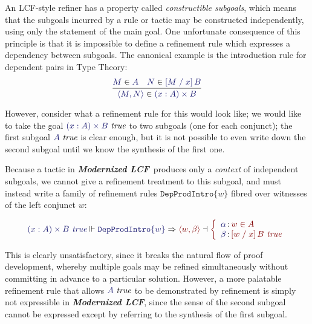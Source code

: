 \documentclass[11pt]{article}
\theoremstyle{definition}
\theoremstyle{remark}
\numberwithin{equation}{section}
\def\InputModeColorName{MidnightBlue}
\def\OutputModeColorName{Maroon}
\newcommand\InputMode[1]{{\color{\InputModeColorName}{#1}}}
\newcommand\OutputMode[1]{{\color{\OutputModeColorName}{#1}}}
\newcommand\Tuple[1]{\left\langle#1\right\rangle}
\newcommand\SG[2]{\InputMode{#1}\,{\color{Black}:}\,\OutputMode{#2}}
\newcommand\Refine[4]{\InputMode{#1}\Vdash\InputMode{#2}\Rightarrow\OutputMode{#4}\dashv\OutputMode{#3}}
\newcommand\Member[2]{\InputMode{#1}\in\InputMode{#2}}
\newcommand\MemberUnmoded[2]{#1\in #2}
\newcommand\IsTrue[1]{\InputMode{#1}\ \textit{true}}
\newcommand\IsTrueUnmoded[1]{#1\ \textit{true}}
\newcommand\DProdIntroRule[1]{\mathtt{DepProdIntro}\{#1\}}
\newcommand\TyDProd[3]{(#2:#1) \times #3}
\newcommand\Subst[3]{\left[#1\;/\;#2\right]#3}
\newcommand\ModLCF{\textbf{\emph{Modernized LCF}}}
\begin{document}
An LCF-style refiner has a property called \emph{constructible subgoals}, which
means that the subgoals incurred by a rule or tactic may be constructed
independently, using only the statement of the main goal. One unfortunate
consequence of this principle is that it is impossible to define a refinement
rule which expresses a dependency between subgoals. The canonical example is
the introduction rule for dependent pairs in Type Theory:
\[
  \infer{
    \Member{\Tuple{M,N}}{\TyDProd{A}{x}{B}}
  }{
    \Member{M}{A} &
    \Member{N}{\Subst{M}{x}{B}}
  }
\]

However, consider what a refinement rule for this would look like; we would
like to take the goal $\IsTrue{\TyDProd{A}{x}{B}}$ to two subgoals (one for
each conjunct); the first subgoal $\IsTrue{A}$ is clear enough, but it is not
possible to even write down the second subgoal until we know the synthesis of
the first one.

Because a tactic in \ModLCF\ produces only a \emph{context} of independent
subgoals, we cannot give a refinement treatment to this subgoal, and must
instead write a family of refinement rules $\DProdIntroRule{w}$ fibred over
witnesses of the left conjunct $w$:

\[
  \Refine{\IsTrueUnmoded{\TyDProd{A}{x}{B}}}{\DProdIntroRule{w}}{%
    \left\{\begin{array}{l}
      \SG{\alpha}{\MemberUnmoded{w}{A}}\\
      \SG{\beta}{\IsTrueUnmoded{\Subst{w}{x}{B}}}
    \end{array}\right.
  }{\Tuple{w,\beta}}
\]

This is clearly unsatisfactory, since it breaks the natural flow of proof
development, whereby multiple goals may be refined simultaneously without
committing in advance to a particular solution. However, a more palatable
refinement rule that allows $\IsTrue{A}$ to be demonstrated by refinement is
simply not expressible in \ModLCF, since the sense of the second subgoal cannot
be expressed except by referring to the synthesis of the first subgoal.
\end{document}
